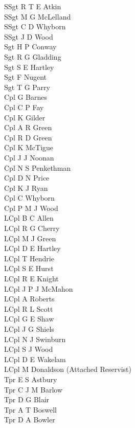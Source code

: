 \begin{multicols}{2}
  \noindent
  SSgt R T E Atkin \\
  SSgt M G McLelland \\
  SSgt C D Whyborn \\
  SSgt J D Wood \\
  Sgt H P Conway \\
  Sgt R G Gladding \\
  Sgt S E Hartley \\
  Sgt F Nugent \\
  Sgt T G Parry \\
  Cpl G Barnes \\
  Cpl C P Fay \\
  Cpl K Gilder \\
  Cpl A R Green \\
  Cpl R D Green \\
  Cpl K McTigue \\
  Cpl J J Noonan \\
  Cpl N S Penkethman \\
  Cpl D N Price \\
  Cpl K J Ryan \\
  Cpl C Whyborn \\
  Cpl P M J Wood \\
  LCpl B C Allen \\
  LCpl R G Cherry \\
  LCpl M J Green \\
  LCpl D E Hartley \\
  LCpl T Hendrie \\
  LCpl S E Hurst \\
  LCpl R E Knight \\
  LCpl J P J McMahon \\
  LCpl A Roberts \\
  LCpl R L Scott \\
  LCpl G E Shaw \\
  LCpl J G Shiels \\
  LCpl N J Swinburn \\
  LCpl S J Wood \\
  LCpl D E Wakelam \\
  LCpl M Donaldson (Attached Reservist) \\
  Tpr E S Astbury \\
  Tpr C J M Barlow \\
  Tpr D G Blair \\
  Tpr A T Boswell \\
  Tpr D A Bowler \\

\end{multicols}
